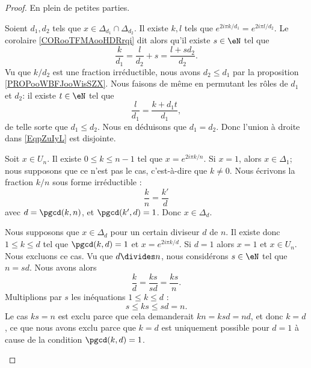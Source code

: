 \begin{proof}
	En plein de petites parties.
	\begin{subproof}
		Soient \( d_1,d_2\) tels que \( x\in\Delta_{d_1}\cap \Delta_{d_2}\). Il existe \( k,l\) tels que \( e^{2i\pi k/d_1}=e^{2i\pi l/d_2}\). Le corolaire  \ref{CORooTFMAooHDRrqi} dit alors qu'il existe \( s\in \eN\) tel que
		\begin{equation}
			\frac{ k }{ d_1 }=\frac{ l }{ d_2 }+s=\frac{ l+sd_2 }{ d_2 }.
		\end{equation}
		Vu que \( k/d_2\) est une fraction irréductible, nous avons \( d_2\leq d_1\) par la proposition \ref{PROPooWBFJooWisSZX}. Nous faisons de même en permutant les rôles de \( d_1\) et \( d_2\): il existe \( t\in \eN\) tel que
		\begin{equation}
			\frac{ l }{ d_1 }=\frac{ k+d_1t }{ d_1 },
		\end{equation}
		de telle sorte que \( d_1\leq d_2\). Nous en déduisons que \( d_1=d_2\). Donc l'union à droite dans \eqref{EqpZuIyL} est disjointe.

		Soit \( x\in U_n\). Il existe \( 0\leq k\leq n-1\) tel que \( x=e^{2i\pi k/n}\). Si \( x=1\), alors \( x\in\Delta_1\); nous supposons que ce n'est pas le cas, c'est-à-dire que \( k\neq 0\). Nous écrivons la fraction \( k/n\) sous forme irréductible :
		\begin{equation}
			\frac{ k }{ n }=\frac{ k' }{ d }
		\end{equation}
		avec \( d=\pgcd(k,n)\), et \( \pgcd(k',d)=1\). Donc \( x\in \Delta_d\).

		Nous supposons que \( x\in\Delta_d\) pour un certain diviseur \( d\) de \( n\). Il existe donc \( 1\leq k\leq d\) tel que \( \pgcd(k,d)=1\) et \( x=e^{2i\pi k/d}\). Si \( d=1\) alors \( x=1\) et \( x\in U_n\). Nous excluons ce cas. Vu que \( d\divides n\), nous considérons \( s\in \eN\) tel que \( n=sd\). Nous avons alors
		\begin{equation}
			\frac{ k }{ d }=\frac{ ks }{ sd }=\frac{ ks }{ n }.
		\end{equation}
		Multiplions par \( s\) les inéquations \( 1\leq k\leq d\) :
		\begin{equation}
			s\leq ks\leq sd=n.
		\end{equation}
		Le cas \( ks=n\) est exclu parce que cela demanderait \( kn=ksd=nd\), et donc \( k=d\), ce que nous avons exclu parce que \( k=d\) est uniquement possible pour \( d=1\) à cause de la condition \( \pgcd(k,d)=1\).
	\end{subproof}
\end{proof}

